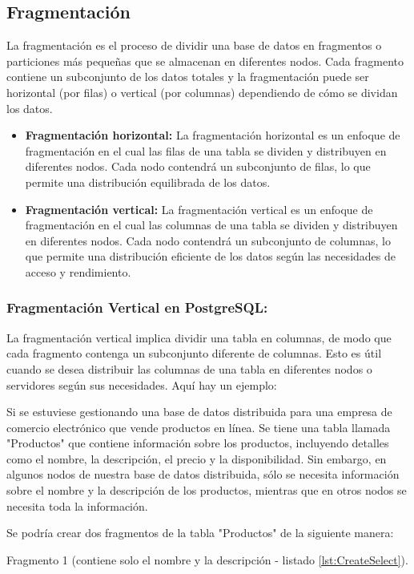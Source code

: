 \subsection{Fragmentación}
\noindent
La fragmentación es el proceso de dividir una base de datos en fragmentos o particiones más pequeñas que se almacenan en diferentes nodos. Cada fragmento contiene un subconjunto de los datos totales y la fragmentación puede ser horizontal (por filas) o vertical (por columnas) dependiendo de cómo se dividan los datos.
\begin{itemize}
	\item \textbf{Fragmentación horizontal:} La fragmentación horizontal es un enfoque de fragmentación en el cual las filas de una tabla se dividen y distribuyen en diferentes nodos. Cada nodo contendrá un subconjunto de filas, lo que permite una distribución equilibrada de los datos.
	\item \textbf{Fragmentación vertical:} La fragmentación vertical es un enfoque de fragmentación en el cual las columnas de una tabla se dividen y distribuyen en diferentes nodos. Cada nodo contendrá un subconjunto de columnas, lo que permite una distribución eficiente de los datos según las necesidades de acceso y rendimiento.
\end{itemize}

\subsubsection{Fragmentación Vertical en PostgreSQL:}
\noindent
La fragmentación vertical implica dividir una tabla en columnas, de modo que cada fragmento contenga un subconjunto diferente de columnas. Esto es útil cuando se desea distribuir las columnas de una tabla en diferentes nodos o servidores según sus necesidades. Aquí hay un ejemplo:

Si se estuviese gestionando una base de datos distribuida para una empresa de comercio electrónico que vende productos en línea. Se tiene una tabla llamada "Productos" que contiene información sobre los productos, incluyendo detalles como el nombre, la descripción, el precio y la disponibilidad. Sin embargo, en algunos nodos de nuestra base de datos distribuida, sólo se necesita información sobre el nombre y la descripción de los productos, mientras que en otros nodos se necesita toda la información.

Se podría crear dos fragmentos de la tabla "Productos" de la siguiente manera:

Fragmento 1 (contiene solo el nombre y la descripción - listado \ref{lst:CreateSelect}). 

